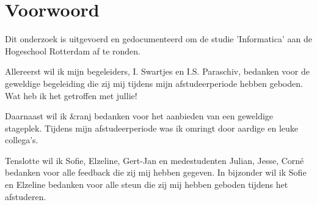 \chapter*{Voorwoord}
Dit onderzoek is uitgevoerd en gedocumenteerd om de studie 'Informatica' aan de Hogeschool Rotterdam af te ronden.

\vspace{5mm}

\noindent
Allereerst wil ik mijn begeleiders, I. Swartjes en I.S. Paraschiv, bedanken voor de geweldige begeleiding die zij mij tijdens mijn afstudeerperiode hebben geboden. Wat heb ik het getroffen met jullie!

\vspace{5mm}

\noindent
Daarnaast wil ik \&ranj bedanken voor het aanbieden van een geweldige stageplek. Tijdens mijn afstudeerperiode was ik omringt door aardige en leuke collega's.

\vspace{5mm}

\noindent
Tenslotte wil ik Sofie, Elzeline, Gert-Jan en medestudenten Julian, Jesse, Corné bedanken voor alle feedback die zij mij hebben gegeven. In bijzonder wil ik Sofie en Elzeline bedanken voor alle steun die zij mij hebben geboden tijdens het afstuderen.